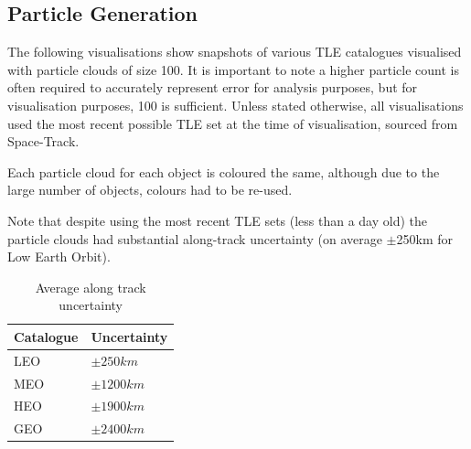 \documentclass[12pt,openany,a4paper]{book}
\begin{document}
		\subsection{Particle Generation}
		
		The following visualisations show snapshots of various TLE catalogues visualised with particle clouds of size 100. It is important to note a higher particle count is often required to accurately represent error for analysis purposes, but for visualisation purposes, 100 is sufficient. Unless stated otherwise, all visualisations used the most recent possible TLE set at the time of visualisation, sourced from Space-Track. \newline
		
		Each particle cloud for each object is coloured the same, although due to the large number of objects, colours had to be re-used. \newline
		
		Note that despite using the most recent TLE sets (less than a day old) the particle clouds had substantial along-track uncertainty (on average $\pm$250km for Low Earth Orbit).
	
				\begin{table}[H]
					\caption{Average along track uncertainty}
					\centering
					\begin{tabular}{ll}
						\toprule
						Catalogue & Uncertainty \\
						\midrule
						LEO & $\pm250km$ \\
						MEO & $\pm1200km$  \\
						HEO & $\pm1900km$ \\
						GEO & $\pm2400km$ \\
						\bottomrule
					\end{tabular}
				\end{table}	
\end{document}
